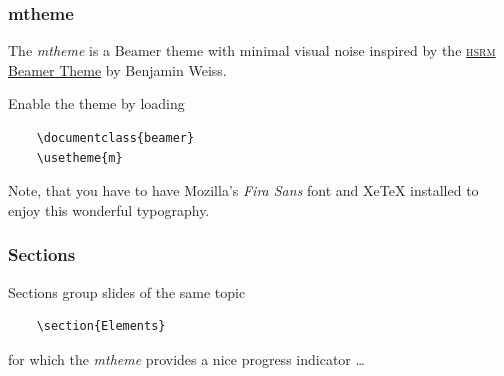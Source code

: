 \documentclass[10pt, compress]{beamer}
\begin{document}
\begin{frame}[fragile]
  \frametitle{mtheme}

  The \emph{mtheme} is a Beamer theme with minimal visual noise inspired by the
  \href{https://github.com/hsrmbeamertheme/hsrmbeamertheme}{\textsc{hsrm} Beamer
  Theme} by Benjamin Weiss.

  Enable the theme by loading

  \begin{verbatim}
    \documentclass{beamer}
    \usetheme{m}
  \end{verbatim}

  Note, that you have to have Mozilla's \emph{Fira Sans} font and XeTeX
  installed to enjoy this wonderful typography.
\end{frame}

\begin{frame}[fragile]
  \frametitle{Sections}
  Sections group slides of the same topic

  \begin{verbatim}
    \section{Elements}
  \end{verbatim}

  for which the \emph{mtheme} provides a nice progress indicator \ldots
\end{frame}
\end{document}
